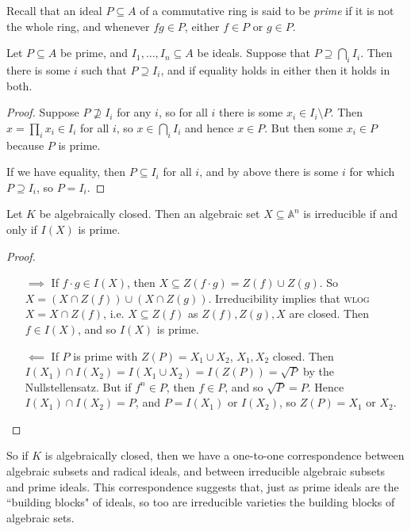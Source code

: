 \documentclass[10pt,a4paper]{article}
\begin{document}
Recall that an ideal $P \subseteq A$ of a commutative ring is said to be \emph{prime} if it is not the whole ring, and whenever $fg \in P$, either $f \in P$ or $g \in P$.

\begin{lemma}
Let $P \subseteq A$ be prime, and $I_1, \ldots, I_n \subseteq A$ be ideals. Suppose that $P \supseteq \bigcap_i I_i$. Then there is some $i$ such that $P \supseteq I_i$, and if equality holds in either then it holds in both.
\end{lemma}
\begin{proof}
Suppose $P \nsupseteq I_i$ for any $i$, so for all $i$ there is some $x_i \in I_i \setminus P$. Then $x = \prod_i x_i \in I_i$ for all $i$, so $x \in \bigcap_i I_i$ and hence $x \in P$. But then some $x_i \in P$ because $P$ is prime. \contr

If we have equality, then $P \subseteq I_i$ for all $i$, and by above there is some $i$ for which $P \supseteq I_i$, so $P = I_i$.
\end{proof}

\begin{proposition}
Let $K$ be algebraically closed. Then an algebraic set $X \subseteq \mathbb{A}^n$ is irreducible if and only if $I(X)$ is prime.
\end{proposition}
\begin{proof}
\item
\begin{itemize}
\item[$\implies$] If $f\cdot g \in I(X)$, then $X \subseteq Z(f\cdot g) = Z(f) \cup Z(g)$. So $X = (X \cap Z(f)) \cup (X \cap Z(g))$. Irreducibility implies that \textsc{wlog} $X = X\cap Z(f)$, i.e. $X \subseteq Z(f)$ as $Z(f), Z(g), X$ are closed. Then $f \in I(X)$, and so $I(X)$ is prime.

\item[$\impliedby$] If $P$ is prime with $Z(P) = X_1 \cup X_2$, $X_1, X_2$ closed. Then $I(X_1) \cap I(X_2) = I(X_1\cup X_2) = I(Z(P)) = \sqrt{P}$ by the Nullstellensatz. But if $f^n \in P$, then $f \in P$, and so $\sqrt{P} = P$. Hence $I(X_1)\cap I(X_2) = P$, and $P = I(X_1)$ or $I(X_2)$, so $Z(P) = X_1$ or $X_2$.
\end{itemize}
\end{proof}
So if $K$ is algebraically closed, then we have a one-to-one correspondence between algebraic subsets and radical ideals, and between irreducible algebraic subsets and prime ideals. This correspondence suggests that, just as prime ideals are the ``building blocks" of ideals, so too are irreducible varieties the building blocks of algebraic sets.
\end{document}
